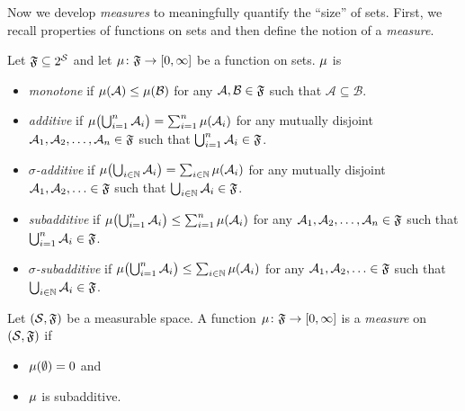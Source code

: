 Now we develop \emph{measures} to meaningfully quantify the \enquote{size} of sets.
First, we recall properties of functions on sets and then define the notion of a \emph{measure}.
\begin{definition}%
	\label{def:properties of functions on sets}
	Let \( \mathfrak{F} \subseteq 2^{\mathcal{S}} \) and let \( \map{\Measure}{\SigmaAlgebraSymbol}{\interval{\num{0}}{\infty}} \) be a function on sets.
	\( \mu \) is
	\begin{itemize}
		\item \emph{monotone} if \( \mu(\mathcal{A}) \leq \mu(\mathcal{B}) \) for any \( \mathcal{A}, \mathcal{B} \in \mathfrak{F} \) such that \( \mathcal{A} \subseteq \mathcal{B} \).
		\item \emph{additive} if \( \mu\bigl(\bigcup_{i=\num{1}}^n \mathcal{A}_i \bigr) = \sum_{i=1}^n \mu(\mathcal{A}_i) \) for any mutually disjoint \( \mathcal{A}_{\num{1}},\mathcal{A}_{\num{2}},\allowbreak\dotsc,\allowbreak\mathcal{A}_n \in \mathfrak{F} \) such that \( \bigcup_{i=\num{1}}^n \mathcal{A}_i \in \mathfrak{F} \).
		\item \emph{\(\sigma\)-additive} if \( \mu\bigl(\bigcup_{i\in\mathbb{N}} \mathcal{A}_i \bigr) = \sum_{i\in\mathbb{N}} \mu(\mathcal{A}_i) \) for any mutually disjoint \( \mathcal{A}_{\num{1}},\allowbreak\mathcal{A}_{\num{2}},\allowbreak\dotsc \in \mathfrak{F} \) such that \( \bigcup_{i\in \mathbb{N}} \mathcal{A}_i \in \mathfrak{F} \).
		\item \emph{subadditive} if \( \mu\bigl(\bigcup_{i=1}^n \mathcal{A}_i \bigr) \leq \sum_{i=\num{1}}^n \mu(\mathcal{A}_i) \) for any \( \mathcal{A}_{1},\mathcal{A}_{\num{2}},\dotsc,\mathcal{A}_n \in \mathfrak{F} \) such that \( \bigcup_{i=1}^n \mathcal{A}_i \in \mathfrak{F} \).
		\item \emph{\(\sigma\)-subadditive} if \( \mu\bigl(\bigcup_{i=1}^n \mathcal{A}_i \bigr) \leq \sum_{i\in\mathbb{N}} \mu(\mathcal{A}_i) \) for any \( \mathcal{A}_{1},\mathcal{A}_{\num{2}},\dotsc \in \mathfrak{F} \) such that \( \bigcup_{i\in\mathbb{N}} \mathcal{A}_i \in \mathfrak{F} \).
	\end{itemize}
\end{definition}
\begin{definition}[Measure]%
	\label{def:measure}
	Let \( (\mathcal{S}, \mathfrak{F}) \) be a measurable space.
	A function \( \map{\Measure}{\SigmaAlgebraSymbol}{\interval{\num{0}}{\infty}} \) is a \emph{measure} on \( (\mathcal{S}, \mathfrak{F}) \) if
	\begin{itemize}
		\item \( \mu(\emptyset) = \num{0} \) and
		\item \( \mu \) is subadditive.
	\end{itemize}
\end{definition}
